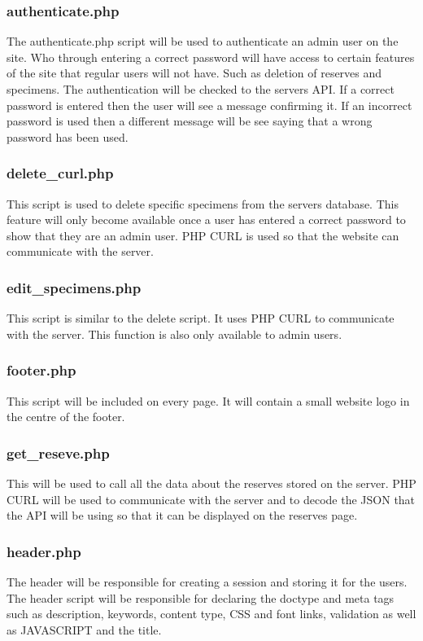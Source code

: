 \begin{itemize}
	\subsubsection{authenticate.php}
		The authenticate.php script will be used to authenticate an admin user on the site. Who through entering a correct password will have access to certain features of the site that regular users will not have. Such as deletion of reserves and specimens. The authentication will be checked to the servers API. If a correct password is entered then the user will see a message confirming it. If an incorrect password is used then a different message will be see saying that a wrong password has been used.


	\subsubsection{delete\_curl.php}
		This script is used to delete specific specimens from the servers database. This feature will only become available once a user has entered a correct password to show that they are an admin user. PHP CURL is used so that the website can communicate with the server.


	\subsubsection{edit\_specimens.php}
		This script is similar to the delete script. It uses PHP CURL to communicate with the server. This function is also only available to admin users.


	\subsubsection{footer.php}
		This script will be included on every page. It will contain a small website logo in the centre of the footer. 


	\subsubsection{get\_reseve.php}
		This will be used to call all the data about the reserves stored on the server. PHP CURL will be used to communicate with the server and to decode the JSON that the API will be using so that it can be displayed on the reserves page.

	\subsubsection{header.php}
		The header will be responsible for creating a session and storing it for the users. The header script will be responsible for declaring the doctype and meta tags such as description, keywords, content type, CSS and font links, validation as well as JAVASCRIPT and the title. 


\end{itemize}
